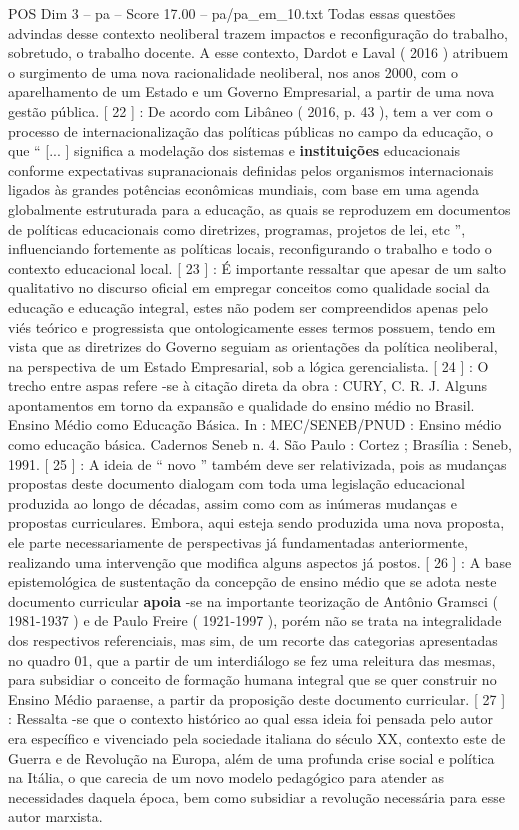 \begin{textsample}{POS Dim 3 – pa – Score 17.00 – pa/pa\_em\_10.txt}
Todas essas questões advindas desse contexto neoliberal trazem impactos e reconfiguração do trabalho, sobretudo, o trabalho docente.
A esse contexto, Dardot e Laval ( 2016 ) atribuem o surgimento de uma nova racionalidade neoliberal, nos anos 2000, com o aparelhamento de um Estado e um Governo Empresarial, a partir de uma nova gestão pública. [ 22 ] : De acordo com Libâneo ( 2016, p. 43 ), tem a ver com o processo de internacionalização das políticas públicas no campo da educação, o que “ [... ] significa a modelação dos sistemas e \textbf{instituições} educacionais conforme expectativas supranacionais definidas pelos organismos internacionais ligados às grandes potências econômicas mundiais, com base em uma agenda globalmente estruturada para a educação, as quais se reproduzem em documentos de políticas educacionais como diretrizes, programas, projetos de lei, etc ”, influenciando fortemente as políticas locais, reconfigurando o trabalho e todo o contexto educacional local. [ 23 ] : É importante ressaltar que apesar de um salto qualitativo no discurso oficial em empregar conceitos como qualidade social da educação e educação integral, estes não podem ser compreendidos apenas pelo viés teórico e progressista que ontologicamente esses termos possuem, tendo em vista que as diretrizes do Governo seguiam as orientações da política neoliberal, na perspectiva de um Estado Empresarial, sob a lógica gerencialista. [ 24 ] : O trecho entre aspas refere -se à citação direta da obra : CURY, C.
R.
J.
Alguns apontamentos em torno da expansão e qualidade do ensino médio no Brasil.
Ensino Médio como Educação Básica.
In : MEC/SENEB/PNUD : Ensino médio como educação básica.
Cadernos Seneb n. 4.
São Paulo : Cortez ; Brasília : Seneb, 1991. [ 25 ] : A ideia de “ novo ” também deve ser relativizada, pois as mudanças propostas deste documento dialogam com toda uma legislação educacional produzida ao longo de décadas, assim como com as inúmeras mudanças e propostas curriculares.
Embora, aqui esteja sendo produzida uma nova proposta, ele parte necessariamente de perspectivas já fundamentadas anteriormente, realizando uma intervenção que modifica alguns aspectos já postos. [ 26 ] : A base epistemológica de sustentação da concepção de ensino médio que se adota neste documento curricular \textbf{apoia} -se na importante teorização de Antônio Gramsci ( 1981-1937 ) e de Paulo Freire ( 1921-1997 ), porém não se trata na integralidade dos respectivos referenciais, mas sim, de um recorte das categorias apresentadas no quadro 01, que a partir de um interdiálogo se fez uma releitura das mesmas, para subsidiar o conceito de formação humana integral que se quer construir no Ensino Médio paraense, a partir da proposição deste documento curricular. [ 27 ] : Ressalta -se que o contexto histórico ao qual essa ideia foi pensada pelo autor era específico e vivenciado pela sociedade italiana do século XX, contexto este de Guerra e de Revolução na Europa, além de uma profunda crise social e política na Itália, o que carecia de um novo modelo pedagógico para atender as necessidades daquela época, bem como subsidiar a revolução necessária para esse autor marxista.

\end{textsample}
